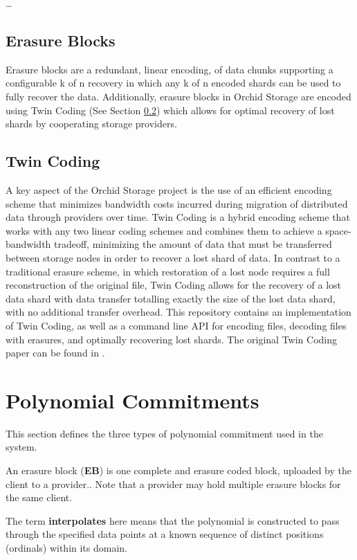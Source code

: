 \documentclass{article}
\begin{document}
…

\subsection{Erasure Blocks}

Erasure blocks are a redundant, linear encoding, of data chunks supporting a configurable k of n recovery in which any k of n encoded shards can be used to fully recover the data.  Additionally, erasure blocks in Orchid Storage are encoded using Twin Coding (See Section \ref{Twin Coding}) which allows for optimal recovery of lost shards by cooperating storage providers.

\subsection{Twin Coding} \label{Twin Coding}

A key aspect of the Orchid Storage project is the use of an efficient encoding scheme that minimizes bandwidth costs incurred during migration of distributed data through providers over time.
Twin Coding is a hybrid encoding scheme that works with any two linear coding schemes and combines them to achieve a space-bandwidth tradeoff, minimizing the amount of data that must be transferred between storage nodes in order to recover a lost shard of data. In contrast to a traditional erasure scheme, in which restoration of a lost node requires a full reconstruction of the original file, Twin Coding allows for the recovery of a lost data shard with data transfer totalling exactly the size of the lost data shard, with no additional transfer overhead.
This repository contains an implementation of Twin Coding, as well as a command line API for encoding files, decoding files with erasures, and optimally recovering lost shards.
The original Twin Coding paper can be found in \cite{rashmi2011enabling}.

\section{Polynomial Commitments}

This section defines the three types of polynomial commitment used in the system.  

An erasure block (\textbf{EB}) is one complete and erasure coded block, uploaded by the client to a provider..  Note that a provider may hold multiple erasure blocks for the same client.  

The term \textbf{interpolates} here means that the polynomial is constructed to pass through the specified data points at a known sequence of distinct positions (ordinals) within its domain.
\end{document}

